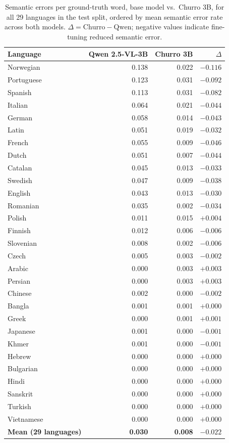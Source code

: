 \documentclass{anthology-ch}         %
\begin{document}
\begin{table}[h]
  \centering
  \caption{Semantic errors per ground-truth word, base model vs.\ Churro 3B,
    for all 29 languages in the test split, ordered by mean semantic error
    rate across both models. $\Delta = \text{Churro} - \text{Qwen}$;
    negative values indicate fine-tuning reduced semantic error.}
  \label{tab:churro-delta}
  \begin{tabular}{lrrr}
    \toprule
    Language & Qwen 2.5-VL-3B & Churro 3B & $\Delta$ \\
    \midrule
    Norwegian  & 0.138 & 0.022 & $-0.116$ \\
    Portuguese & 0.123 & 0.031 & $-0.092$ \\
    Spanish    & 0.113 & 0.031 & $-0.082$ \\
    Italian    & 0.064 & 0.021 & $-0.044$ \\
    German     & 0.058 & 0.014 & $-0.043$ \\
    Latin      & 0.051 & 0.019 & $-0.032$ \\
    French     & 0.055 & 0.009 & $-0.046$ \\
    Dutch      & 0.051 & 0.007 & $-0.044$ \\
    Catalan    & 0.045 & 0.013 & $-0.033$ \\
    Swedish    & 0.047 & 0.009 & $-0.038$ \\
    English    & 0.043 & 0.013 & $-0.030$ \\
    Romanian   & 0.035 & 0.002 & $-0.034$ \\
    Polish     & 0.011 & 0.015 & $+0.004$ \\
    Finnish    & 0.012 & 0.006 & $-0.006$ \\
    Slovenian  & 0.008 & 0.002 & $-0.006$ \\
    Czech      & 0.005 & 0.003 & $-0.002$ \\
    Arabic     & 0.000 & 0.003 & $+0.003$ \\
    Persian    & 0.000 & 0.003 & $+0.003$ \\
    Chinese    & 0.002 & 0.000 & $-0.002$ \\
    Bangla     & 0.001 & 0.001 & $+0.000$ \\
    Greek      & 0.000 & 0.001 & $+0.001$ \\
    Japanese   & 0.001 & 0.000 & $-0.001$ \\
    Khmer      & 0.001 & 0.000 & $-0.001$ \\
    Hebrew     & 0.000 & 0.000 & $+0.000$ \\
    Bulgarian  & 0.000 & 0.000 & $+0.000$ \\
    Hindi      & 0.000 & 0.000 & $+0.000$ \\
    Sanskrit   & 0.000 & 0.000 & $+0.000$ \\
    Turkish    & 0.000 & 0.000 & $+0.000$ \\
    Vietnamese & 0.000 & 0.000 & $+0.000$ \\
    \midrule
    \textbf{Mean (29 languages)} & \textbf{0.030} & \textbf{0.008} & \textbf{$-0.022$} \\
    \bottomrule
  \end{tabular}
\end{table}
\end{document}
